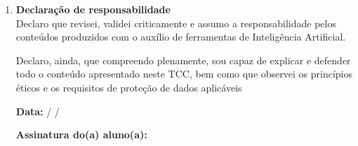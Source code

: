 \begin{anexosenv}
\begin{enumerate}
\vspace{0.38cm}
\vspace{0.12cm}
\noindent\checkbox\hspace{0.12cm}Medidas adotadas: \formline{10.65cm}

\vspace{0.42cm}
\formline{15.25cm}

\vspace*{0.45cm}
\item \textbf{Declaração de responsabilidade}\\

Declaro que revisei, validei criticamente e assumo a responsabilidade pelos conteúdos produzidos com o auxílio de ferramentas de Inteligência Artificial.

\vspace{0.55cm}
Declaro, ainda, que compreendo plenamente, sou capaz de explicar e defender todo o conteúdo apresentado neste TCC, bem como que observei os princípios éticos e os requisitos de proteção de dados aplicáveis

\vspace{1.0cm}
\textbf{Data:} \formline{0.85cm} / \formline{0.85cm} / \formline{1.5cm}

\vspace{0.55cm}
\textbf{Assinatura do(a) aluno(a):} \formline{7.9cm}
\end{enumerate}

\end{anexosenv}